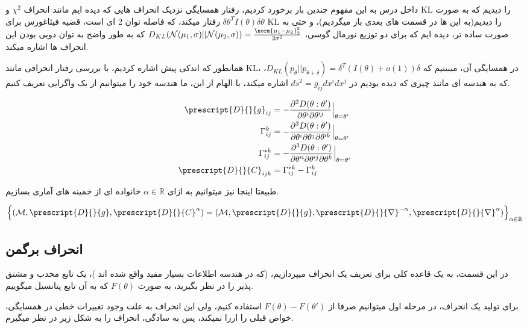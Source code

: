 داخل درس به این مفهوم چندین بار برخورد کردیم، رفتار همسایگی نزدیک انحراف هایی که دیده ایم مانند انحراف $\chi^2$ و KL را دیدیم که به صورت $\delta\theta^TI(\theta)\delta\theta$ رفتار میکند، که فاصله توان 2 ای است، قضیه فیثاغورس برای KL را دیدیم(به این ها در قسمت های بعدی باز میگردیم)، و حتی به صورت ساده تر، دیده ایم که برای دو توزیع نورمال گوسی، $D_{KL}(\mathcal{N}(\mu_1, \sigma)||\mathcal{N}(\mu_2, \sigma))=\frac{\norm{\mu_1-\mu_2}^2_2}{2\sigma^2}$ که به طور واضح به توان دویی بودن این انحراف ها اشاره میکند.

\vspace*{1em}

همانطور که اندکی پیش اشاره کردیم، با بررسی رفتار انحرافی مانند KL، در همسایگی آن، میبینیم که $D_{KL}(p_\theta||p_{\theta+\delta})=\delta^T(I(\theta)+o(1))\delta$، که به هندسه ای مانند چیزی که دیده بودیم در $ds^2=g_{ij}dx^idx^j$ اشاره میکند، با الهام از این، ما هندسه خود را میتوانیم از یک واگرایی تعریف کنیم.

\begin{align*}
    \prescript{D}{}{g}_{ij}&=-\frac{\partial^2D(\theta:\theta')}{\partial\theta^i\partial\theta'^j}\Big|_{\theta=\theta'}\\
    \Gamma_{ij}^k&=-\frac{\partial^3D(\theta:\theta')}{\partial\theta^i\partial\theta^j\partial\theta'^k}\Big|_{\theta=\theta'}\\
    \Gamma_{ij}^{*k}&=-\frac{\partial^3D(\theta:\theta')}{\partial\theta'^i\partial\theta'^j\partial\theta^k}\Big|_{\theta=\theta'}\\
    \prescript{D}{}{C}_{ijk}&=\Gamma_{ij}^{*k}-\Gamma_{ij}^k
\end{align*}

طبیعتا اینجا نیز میتوانیم به ازای $\alpha\in\mathbb{R}$ خانواده ای از خمینه های آماری بسازیم.

$$\left\{(\mathcal{M},\prescript{D}{}{g},\prescript{D}{}{C}^\alpha)=(\mathcal{M},\prescript{D}{}{g},\prescript{D}{}{\nabla}^{-\alpha},\prescript{D}{}{\nabla}^{\alpha})\right\}_{\alpha\in\mathbb{R}}$$

\subsection{انحراف برگمن}

در این قسمت، به یک قاعده کلی برای تعریف یک انحراف میپردازیم، (که در هندسه اطلاعات بسیار مفید واقع شده اند \cite{divergence-functions})، یک تابع محدب و مشتق پذیر را در نظر بگیرید، به صورت $F(\theta)$ که به آن تابع پتانسیل میگوییم.

برای تولید یک انحراف، در مرحله اول میتوانیم صرفا از $F(\theta)-F(\theta')$ استفاده کنیم، ولی این انحراف به علت وجود تغییرات خطی در همسایگی، خواص قبلی را ارزا نمیکند، پس به سادگی، انحراف را به شکل زیر در نظر میگیرم.

